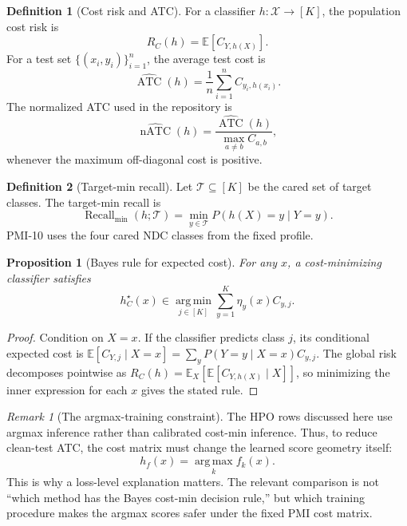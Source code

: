 \documentclass[11pt]{article}
\newcommand{\argmax}{\operatorname*{arg\,max}}
\newcommand{\argmin}{\operatorname*{arg\,min}}
\newcommand{\E}{\mathbb{E}}
\theoremstyle{definition}
\newtheorem{definition}{Definition}
\theoremstyle{plain}
\newtheorem{proposition}{Proposition}
\theoremstyle{remark}
\newtheorem{remark}{Remark}
\begin{document}
\begin{definition}[Cost risk and ATC]
For a classifier $h:\mathcal{X}\to[K]$, the population cost risk is
\begin{equation}
  R_C(h)=\E\left[C_{Y,h(X)}\right].
\end{equation}
For a test set $\{(x_i,y_i)\}_{i=1}^{n}$, the average test cost is
\begin{equation}
  \widehat{\operatorname{ATC}}(h)=
  \frac{1}{n}\sum_{i=1}^n C_{y_i,h(x_i)}.
\end{equation}
The normalized ATC used in the repository is
\begin{equation}
  \widehat{\operatorname{nATC}}(h)=
  \frac{\widehat{\operatorname{ATC}}(h)}
       {\max_{a\ne b} C_{a,b}},
\end{equation}
whenever the maximum off-diagonal cost is positive.
\end{definition}

\begin{definition}[Target-min recall]
Let $\mathcal{T}\subseteq[K]$ be the cared set of target classes.
The target-min recall is
\begin{equation}
  \operatorname{Recall}_{\min}(h;\mathcal{T})
  =
  \min_{y\in\mathcal{T}}
  P(h(X)=y\mid Y=y).
\end{equation}
PMI-10 uses the four cared NDC classes from the fixed profile.
\end{definition}

\begin{proposition}[Bayes rule for expected cost]
For any $x$, a cost-minimizing classifier satisfies
\begin{equation}
  h_C^\star(x)\in
  \argmin_{j\in[K]}
  \sum_{y=1}^{K}\eta_y(x)C_{y,j}.
\end{equation}
\end{proposition}

\begin{proof}
Condition on $X=x$.
If the classifier predicts class $j$, its conditional expected cost is
$\E[C_{Y,j}\mid X=x]=\sum_y P(Y=y\mid X=x)C_{y,j}$.
The global risk decomposes pointwise as
$R_C(h)=\E_X[\E[C_{Y,h(X)}\mid X]]$, so minimizing the inner expression for each
$x$ gives the stated rule.
\end{proof}

\begin{remark}[The argmax-training constraint]
The HPO rows discussed here use argmax inference rather than calibrated cost-min inference.
Thus, to reduce clean-test ATC, the cost matrix must change the learned score geometry itself:
\begin{equation}
  h_f(x)=\argmax_{k} f_k(x).
\end{equation}
This is why a loss-level explanation matters.
The relevant comparison is not ``which method has the Bayes cost-min decision rule,'' but which training procedure makes the argmax scores safer under the fixed PMI cost matrix.
\end{remark}
\end{document}
